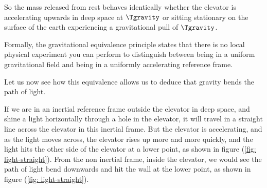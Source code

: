 So the mass released from rest behaves identically whether the elevator is accelerating upwards in deep space at $\Tgravity$ or sitting stationary on the surface of the earth experiencing a gravitational pull of $\Tgravity$.

Formally, the gravitational equivalence principle states that there is no local physical experiment you can perform to distinguish between being in a uniform gravitational field and being in a uniformly accelerating reference frame.

Let us now see how this equivalence allows us to deduce that gravity bends the path of light.

If we are in an inertial reference frame outside the elevator in deep space, and shine a light horizontally through a hole in the elevator, it will travel in a straight line across the elevator in this inertial frame.
But the elevator is accelerating, and as the light moves across, the elevator rises up more and more quickly, and the light hits the other side of the elevator at a lower point, as shown in figure (\ref{fig: light-straight}).
From the non inertial frame, inside the elevator, we would see the path of light bend downwards and hit the wall at the lower point, as shown in figure (\ref{fig: light-straight}).

